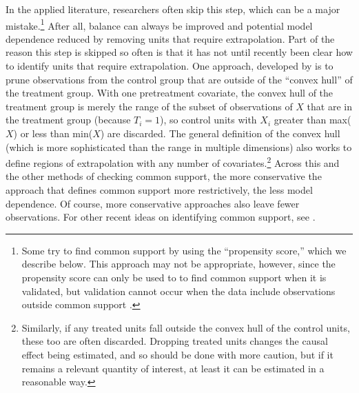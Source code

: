 \documentclass[11pt,titlepage]{article}
\begin{document}
In the applied literature, researchers often skip this step, which can
be a major mistake.\footnote{Some try to find common support by using
  the ``propensity score,'' which we describe below.  This approach
  may not be appropriate, however, since the propensity score can only
  be used to to find common support when it is validated, but
  validation cannot occur when the data include observations outside
  common support \citep[see][and the discussion below]{KinZen06b}.}
After all, balance can always be improved and potential model
dependence reduced by removing units that require extrapolation.  Part
of the reason this step is skipped so often is that it has not until
recently been clear how to identify units that require extrapolation.
One approach, developed by \citet{KinZen06b} is to prune observations
from the control group that are outside of the ``convex hull'' of the
treatment group.  With one pretreatment covariate, the convex hull of
the treatment group is merely the range of the subset of observations
of $X$ that are in the treatment group (because $T_i=1$), so control
units with $X_i$ greater than max($X$) or less than min($X$) are
discarded.  The general definition of the convex hull (which is more
sophisticated than the range in multiple dimensions) also works to
define regions of extrapolation with any number of
covariates.\footnote{Similarly, if any treated units fall outside the
  convex hull of the control units, these too are often discarded.
  Dropping treated units changes the causal effect being estimated,
  and so should be done with more caution, but if it remains a
  relevant quantity of interest, at least it can be estimated in a
  reasonable way.}  Across this and the other methods of checking
common support, the more conservative the approach that defines common
support more restrictively, the less model dependence.  Of course,
more conservative approaches also leave fewer observations.  For other
recent ideas on identifying common support, see \citet{IacPor06}.
\end{document}
